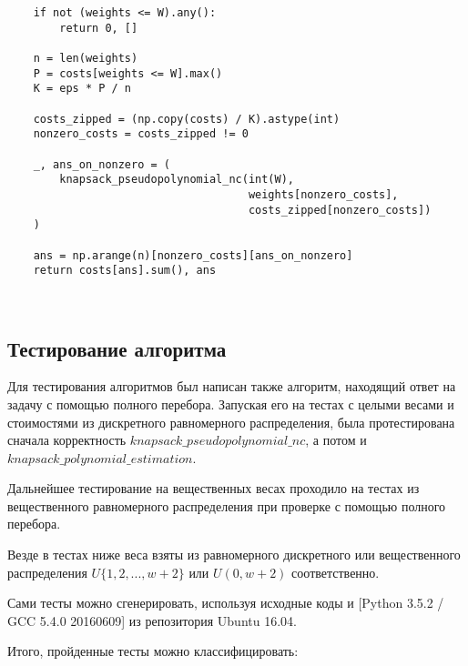 \documentclass{article}
\begin{document}
\begin{verbatim}
    if not (weights <= W).any():
        return 0, []

    n = len(weights)
    P = costs[weights <= W].max()
    K = eps * P / n

    costs_zipped = (np.copy(costs) / K).astype(int)
    nonzero_costs = costs_zipped != 0

    _, ans_on_nonzero = (
        knapsack_pseudopolynomial_nc(int(W),
                                     weights[nonzero_costs],
                                     costs_zipped[nonzero_costs])
    )

    ans = np.arange(n)[nonzero_costs][ans_on_nonzero]
    return costs[ans].sum(), ans



\end{verbatim}
	\subsection{Тестирование алгоритма}
	
	Для тестирования алгоритмов был написан также алгоритм, находящий ответ на задачу с помощью полного перебора. Запуская его на тестах с целыми весами и стоимостями из дискретного равномерного распределения, была протестирована сначала корректность $knapsack\_pseudopolynomial\_nc$, а потом и $knapsack\_polynomial\_estimation$.
	
	Дальнейшее тестирование на вещественных весах проходило на тестах из вещественного равномерного распределения при проверке с помощью полного перебора.
	
	Везде в тестах ниже веса взяты из равномерного дискретного или вещественного распределения $U\{1, 2, ..., w + 2\}$ или $U(0, w + 2)$ соответственно.
	
	Сами тесты можно сгенерировать, используя исходные коды и [Python 3.5.2 / GCC 5.4.0 20160609] из репозитория Ubuntu 16.04.
	
	Итого, пройденные тесты можно классифицировать:
	 
\end{document}
